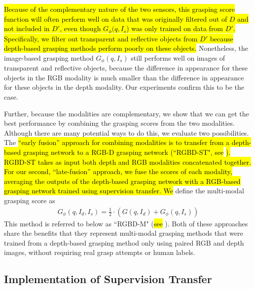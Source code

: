 \hl{Because of the complementary nature of the two sensors, this grasping score function will often perform well on data that was originally filtered out of $D$ and not included in $D'$, even though $G_\phi(q, I_s$) was only trained on data from $D'$.
Specifically, we filter out transparent and reflective objects from $D'$ because depth-based grasping methods perform poorly on these objects.}
Nonetheless, the image-based grasping method $G_\phi(q, I_s)$ still performs well on  images of transparent and reflective objects, because the difference in appearance for these objects in the RGB modality is much smaller than the difference in appearance for these objects in the depth modality.  Our experiments confirm this to be the case.

Further, because the modalities are complementary, we show that we can get the best performance by combining the grasping scores from the two modalities. 
Although there are many potential ways to do this, we evaluate two possibilities.  The \hl{``early fusion'' approach for combining modalities is to transfer from a depth-based grasping network to a RGB-D grasping network (``RGBD-ST", see }\hl{). RGBD-ST takes as input both depth and RGB modalities concatenated together.
For our second, ``late-fusion'' approach, we fuse the scores of each modality, averaging the outputs of the depth-based grasping network with a RGB-based grasping network trained using supervision transfer. We} define the multi-modal grasping score as
\begin{align}
    G_\phi(q, I_d, I_s) = \frac{1}{2} \cdot (G(q, I_d) + G_\phi(q, I_s))
\end{align}
This method is referred to below as ``RGBD-M" (\hl{see} ). Both of these approaches share the benefits that they represent multi-modal grasping methods that were trained from a depth-based grasping method only using paired RGB and depth images, without requiring real grasp attempts or human labels.

\subsection{Implementation of Supervision Transfer}
\label{sec:suptransfer_impl}

